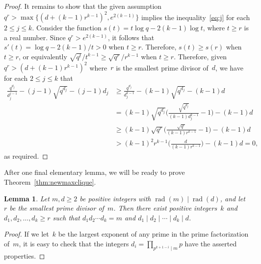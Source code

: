 \documentclass[12pt,reqno]{amsart}
\newtheorem{lem}[thm]{Lemma}
\theoremstyle{definition}
\newcommand{\rad}{\operatorname{rad}}
\begin{document}
\begin{proof}
It remains to show that the given assumption $q^r> \max \{(d+(k-1)r^{k-1})^2,e^{2(k-1)}\}$ implies the inequality~\eqref{eq:j} for each $2 \leq j \leq k$. Consider the function $s(t)=t \log q-2(k-1)\log t$, where $t \geq r$ is a real number. Since $q^r> e^{2(k-1)}$, it follows that $s'(t)=\log q-2(k-1)/t>0$ when $t\geq r$. Therefore, $s(t) \geq s(r)$ when $t \geq r$, or equivalently $\sqrt{q^{t}}/t^{k-1} \geq \sqrt{q^{r}}/r^{k-1}$ when  $t \geq r$. Therefore, given $q^r>(d+(k-1)r^{k-1})^2$ where~$r$ is the smallest prime divisor of~$d$, we have for each $2 \leq j \leq k$ that
\begin{align*}
\frac{q^{d_j}}{d_j^{j-1}}-(j-1)\sqrt{q^{d_j}}-(j-1)d_j 
&\geq \frac{q^{d_j}}{d_j^{k-1}}-(k-1)\sqrt{q^{d_j}} -(k-1)d\\
&= (k-1)\sqrt{q^{d_j}} \bigg(\frac{\sqrt{q^{d_j}}}{(k-1)d_j^{k-1}}-1\bigg)-(k-1)d\\
&\geq (k-1)\sqrt{q^{r}} \bigg(\frac{\sqrt{q^{r}}}{(k-1)r^{k-1}}-1\bigg)-(k-1)d    \\
&>(k-1)^2r^{k-1} \bigg(\frac{d}{(k-1)r^{k-1}}\bigg)-(k-1)d=0,
\end{align*}
as required. 
\end{proof}

After one final elementary lemma, we will be ready to prove Theorem~\ref{thm:newmaxclique}. 

\begin{lem}\label{lem:div2}
Let $m,d\ge2$ be positive integers with $\rad(m)\mid \rad(d)$, and let~$r$ be the smallest prime divisor of~$m$. Then there exist positive integers~$k$ and $d_1, d_2, \ldots, d_k\ge r$ such that
$d_1d_2\cdots d_k=m$
and
$d_1\mid d_2 \mid \cdots \mid d_k \mid d$.
\end{lem}

\begin{proof}
If we let~$k$ be the largest exponent of any prime in the prime factorization of~$m$, it is easy to check that the integers
$d_i = \prod_{p^{k+1-i}\mid m} p$
have the asserted properties.
\end{proof}
\end{document}
